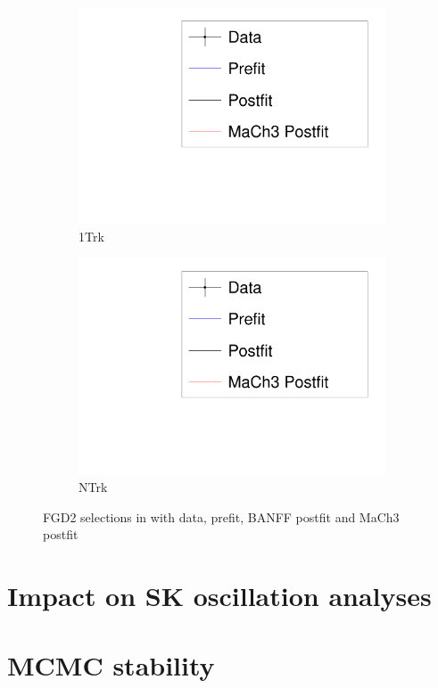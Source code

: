 \begin{figure}
\begin{subfigure}[t]{0.24\textwidth}
		\includegraphics[width=\textwidth, trim={5mm 3mm 15mm 10mm}, clip, page=14]{figures/mach3/banff/mach3banff_mom}
		\caption{\numu 1Trk}
	\end{subfigure}
	\begin{subfigure}[t]{0.24\textwidth}
		\includegraphics[width=\textwidth, trim={5mm 3mm 15mm 10mm}, clip, page=15]{figures/mach3/banff/mach3banff_mom}
		\caption{\numu NTrk}
	\end{subfigure}
	\caption{FGD2 selections in \pmu with data, prefit, BANFF postfit and MaCh3 postfit}
	\label{fig:mach3_banff_postfit_fgd2}
\end{figure}


\section{Impact on SK oscillation analyses}

\section{MCMC stability}
